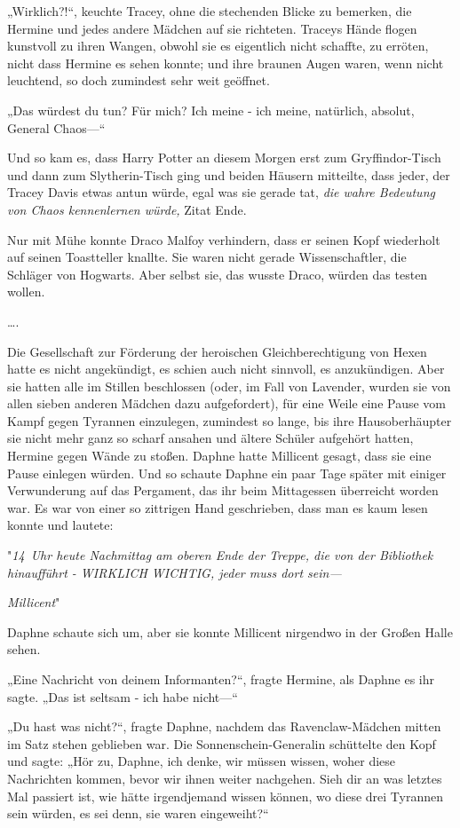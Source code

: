 {„Wirklich?!“, keuchte Tracey, ohne die stechenden Blicke zu bemerken, die Hermine und jedes andere Mädchen auf sie richteten. Traceys Hände flogen kunstvoll zu ihren Wangen, obwohl sie es eigentlich nicht schaffte, zu erröten, nicht dass Hermine es sehen konnte; und ihre braunen Augen waren, wenn nicht leuchtend, so doch zumindest sehr weit geöffnet.

„Das würdest du tun? Für mich? Ich meine - ich meine, natürlich, absolut, General Chaos—“

Und so kam es, dass Harry Potter an diesem Morgen erst zum Gryffindor-Tisch und dann zum Slytherin-Tisch ging und beiden Häusern mitteilte, dass jeder, der Tracey Davis etwas antun würde, egal was sie gerade tat, \emph{die wahre Bedeutung von Chaos kennenlernen würde,} Zitat Ende.

Nur mit Mühe konnte Draco Malfoy verhindern, dass er seinen Kopf wiederholt auf seinen Toastteller knallte. Sie waren nicht gerade Wissenschaftler, die Schläger von Hogwarts. Aber selbst sie, das wusste Draco, würden das testen wollen.

….

Die Gesellschaft zur Förderung der heroischen Gleichberechtigung von Hexen hatte es nicht angekündigt, es schien auch nicht sinnvoll, es anzukündigen. Aber sie hatten alle im Stillen beschlossen (oder, im Fall von Lavender, wurden sie von allen sieben anderen Mädchen dazu aufgefordert), für eine Weile eine Pause vom Kampf gegen Tyrannen einzulegen, zumindest so lange, bis ihre Hausoberhäupter sie nicht mehr ganz so scharf ansahen und ältere Schüler aufgehört hatten, Hermine gegen Wände zu stoßen. Daphne hatte Millicent gesagt, dass sie eine Pause einlegen würden. Und so schaute Daphne ein paar Tage später mit einiger Verwunderung auf das Pergament, das ihr beim Mittagessen überreicht worden war. Es war von einer so zittrigen Hand geschrieben, dass man es kaum lesen konnte und lautete:

"\emph{14~Uhr heute Nachmittag am oberen Ende der Treppe, die von der Bibliothek hinaufführt - WIRKLICH WICHTIG, jeder muss dort sein—}

\emph{Millicent}"

Daphne schaute sich um, aber sie konnte Millicent nirgendwo in der Großen Halle sehen.

„Eine Nachricht von deinem Informanten?“, fragte Hermine, als Daphne es ihr sagte. „Das ist seltsam - ich habe nicht—“

„Du hast was nicht?“, fragte Daphne, nachdem das Ravenclaw-Mädchen mitten im Satz stehen geblieben war. Die Sonnenschein-Generalin schüttelte den Kopf und sagte: „Hör zu, Daphne, ich denke, wir müssen wissen, woher diese Nachrichten kommen, bevor wir ihnen weiter nachgehen. Sieh dir an was letztes Mal passiert ist, wie hätte irgendjemand wissen können, wo diese drei Tyrannen sein würden, es sei denn, sie waren eingeweiht?“

}
